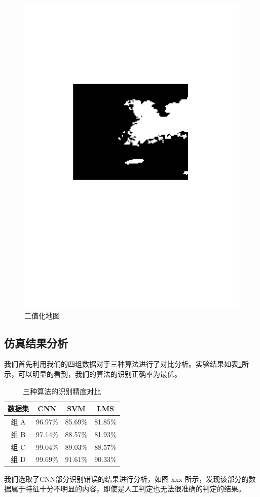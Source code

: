 \begin{figure}
	\centering
	\includegraphics[height=0.25\textheight]{figures/binary}
	\caption{二值化地图}
	\label{fig:binary}
\end{figure}

\subsection{仿真结果分析}
我们首先利用我们的四组数据对于三种算法进行了对比分析。实验结果如表\ref{tab:methods}所示，可以明显的看到，我们的算法的识别正确率为最优。
\begin{table}[!t]
	\renewcommand{\arraystretch}{1.3}
	\caption{三种算法的识别精度对比}
	\label{tab:methods}
	\centering
	\begin{tabular}{c|ccc}
		\hline
		数据集 & CNN & SVM & LMS \\
		\hline
		组 A  & 96.97\% & 85.69\% & 81.85\% \\
		组 B & 97.14\% & 88.57\% & 81.93\% \\
		组 C & 99.04\% & 89.03\% & 88.57\% \\
		组 D  & 99.69\% & 91.61\% & 90.33\% \\
		\hline
	\end{tabular}
\end{table}
我们选取了CNN部分识别错误的结果进行分析，如图 xxx 所示，发现该部分的数据属于特征十分不明显的内容，即使是人工判定也无法很准确的判定的结果。

